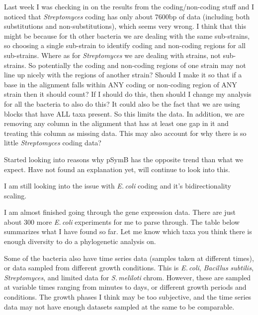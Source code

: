\documentclass[12pt]{article}
\newcommand{\smel}{\textit{S.\,meliloti}\xspace}
\newcommand{\bas}{\textit{Bacillus subtilis}\xspace}
\newcommand{\strep}{\textit{Streptomyces}\xspace}
\newcommand{\ecol}{\textit{E.\,coli}\xspace}
\newcommand{\pb}{pSymB\xspace}
\begin{document}
Last week I was checking in on the results from the coding/non-coding stuff and I noticed that \strep coding has only about 7600bp of data (including both substitutions and non-substitutions), which seems very wrong.
I think that this might be because for th other bacteria we are dealing with the same sub-strains, so choosing a single sub-strain to identify coding and non-coding regions for all sub-strains.
Where as for \strep we are dealing with strains, not sub-strains. So potentially the coding and non-coding regions of one strain may not line up nicely with the regions of another strain?
Should I make it so that if a base in the alignment falls within ANY coding or non-coding region of ANY strain then it should count?
If I should do this, then should I change my analysis for all the bacteria to also do this?
It could also be the fact that we are using blocks that have ALL taxa present. So this limits the data. In addition, we are removing any column in the alignment that has at least one gap in it and treating this column as missing data.
This may also account for why there is so little \strep coding data?

Started looking into reasons why \pb has the opposite trend than what we expect.
Have not found an explanation yet, will continue to look into this.

I am still looking into the issue with \ecol coding and it's bidirectionality scaling.

I am almost finished going through the gene expression data. There are just about 300 more \ecol experiments for me to parse through.
The table below summarizes what I have found so far.
Let me know which taxa you think there is enough diversity to do a phylogenetic analysis on.

Some of the bacteria also have time series data (samples taken at different times), or data sampled from different growth conditions. This is \ecol, \bas, \strep, and limited data for \smel chrom.
However, these are sampled at variable times ranging from minutes to days, or different growth periods and conditions.
The growth phases I think may be too subjective, and the time series data may not have enough datasets sampled at the same to be comparable.



\end{document}
